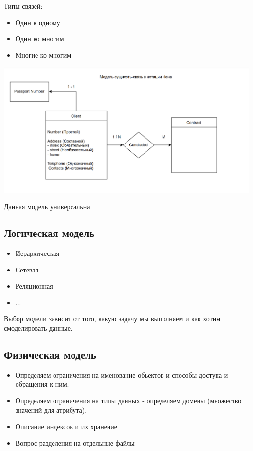 \documentclass[12pt, a4paper]{article}
\begin{document}
Типы связей:
\begin{itemize}
    \item Один к одному
    \item Один ко многим
    \item Многие ко многим
\end{itemize}

\includegraphics[scale=0.7]{data/client_2.png}

Данная модель универсальна

\subsection{Логическая модель}

\begin{itemize}
    \item Иерархическая
    \item Сетевая
    \item Реляционная
    \item ...
\end{itemize}

Выбор модели зависит от того, какую задачу мы выполняем и как хотим смоделировать данные.

\subsection{Физическая модель}

\begin{itemize}
    \item Определяем ограничения на именование объектов и способы доступа и обращения к ним.
    \item Определяем ограничения на типы данных - определяем домены (множество значений для атрибута).
    \item Описание индексов и их хранение
    \item Вопрос разделения на отдельные файлы
\end{itemize}
\end{document}
